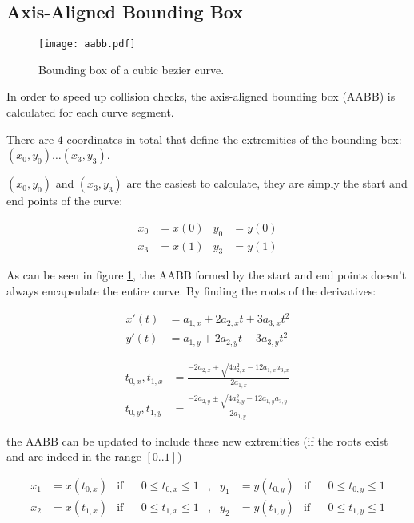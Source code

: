 \clearpage
\subsection{Axis-Aligned Bounding Box}

\begin{figure}
    \centering
    \texttt{[image: aabb.pdf]}
    \caption{Bounding box of a cubic bezier curve.}
    \label{fig:bezier_aabb}
\end{figure}

In order to speed up collision checks, the axis-aligned bounding box (AABB) is calculated for each curve segment.

There are $4$ coordinates in total that define the extremities of the bounding box: $(x_0,y_0) \ldots (x_3,y_3)$.

$(x_0,y_0)$ and $(x_3,y_3)$ are the easiest to calculate, they are simply the start and end points of the curve:

\begin{align}
    x_0 &= x(0) & y_0 &= y(0) \\
    x_3 &= x(1) & y_3 &= y(1)
\end{align}

As can be seen in figure \ref{fig:bezier_aabb}, the AABB formed by the start and end points doesn't always encapsulate the entire curve. By finding the roots of the derivatives:

\begin{align}
    x'(t) &= a_{1,x} + 2 a_{2,x} t + 3 a_{3,x} t^2 \\
    y'(t) &= a_{1,y} + 2 a_{2,y} t + 3 a_{3,y} t^2
\end{align}

\begin{align}
    {t_{0,x},t_{1,x}} &= \frac{-2 a_{2,x} \pm\sqrt{4a_{2,x}^2 - 12 a_{1,x} a_{3,x}}}{2 a_{1,x}} \\
    {t_{0,y},t_{1,y}} &= \frac{-2 a_{2,y} \pm\sqrt{4a_{2,y}^2 - 12 a_{1,y} a_{3,y}}}{2 a_{1,y}}
\end{align}

the AABB can be updated to include these new extremities (if the roots exist and are indeed in the range $[0..1]$)

\begin{align}
    x_1 &= x(t_{0,x}) & \text{if} && 0 \le t_{0,x} \le 1 &,& y_1 &= y(t_{0,y}) & \text{if} && 0 \le t_{0,y} \le 1 \\
    x_2 &= x(t_{1,x}) & \text{if} && 0 \le t_{1,x} \le 1 &,& y_2 &= y(t_{1,y}) & \text{if} && 0 \le t_{1,y} \le 1
\end{align}

